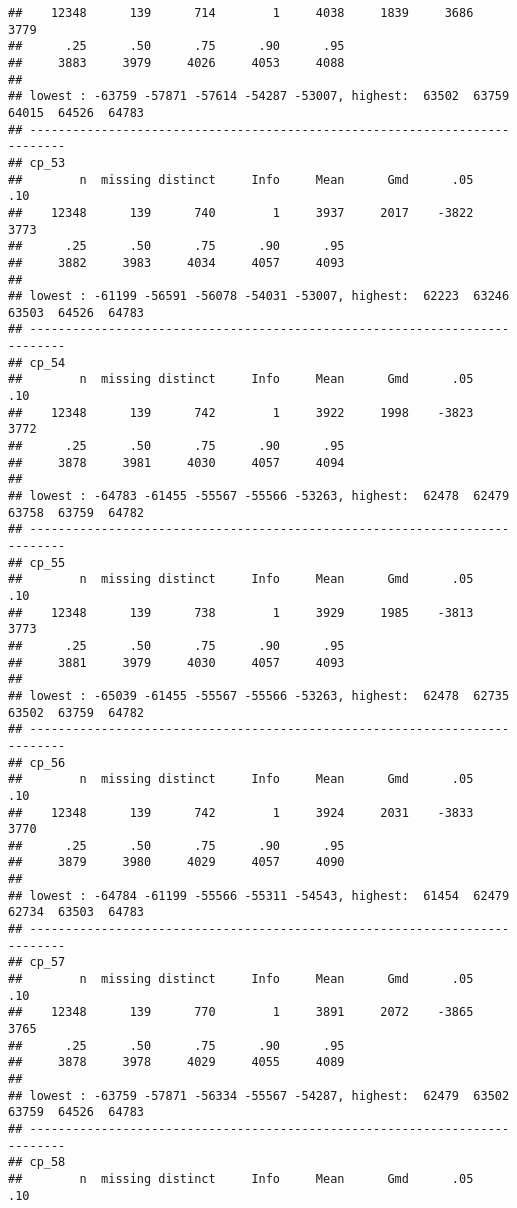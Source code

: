 \documentclass[]{article}
\begin{document}
\begin{verbatim}
##    12348      139      714        1     4038     1839     3686     3779 
##      .25      .50      .75      .90      .95 
##     3883     3979     4026     4053     4088 
## 
## lowest : -63759 -57871 -57614 -54287 -53007, highest:  63502  63759  64015  64526  64783
## ---------------------------------------------------------------------------
## cp_53 
##        n  missing distinct     Info     Mean      Gmd      .05      .10 
##    12348      139      740        1     3937     2017    -3822     3773 
##      .25      .50      .75      .90      .95 
##     3882     3983     4034     4057     4093 
## 
## lowest : -61199 -56591 -56078 -54031 -53007, highest:  62223  63246  63503  64526  64783
## ---------------------------------------------------------------------------
## cp_54 
##        n  missing distinct     Info     Mean      Gmd      .05      .10 
##    12348      139      742        1     3922     1998    -3823     3772 
##      .25      .50      .75      .90      .95 
##     3878     3981     4030     4057     4094 
## 
## lowest : -64783 -61455 -55567 -55566 -53263, highest:  62478  62479  63758  63759  64782
## ---------------------------------------------------------------------------
## cp_55 
##        n  missing distinct     Info     Mean      Gmd      .05      .10 
##    12348      139      738        1     3929     1985    -3813     3773 
##      .25      .50      .75      .90      .95 
##     3881     3979     4030     4057     4093 
## 
## lowest : -65039 -61455 -55567 -55566 -53263, highest:  62478  62735  63502  63759  64782
## ---------------------------------------------------------------------------
## cp_56 
##        n  missing distinct     Info     Mean      Gmd      .05      .10 
##    12348      139      742        1     3924     2031    -3833     3770 
##      .25      .50      .75      .90      .95 
##     3879     3980     4029     4057     4090 
## 
## lowest : -64784 -61199 -55566 -55311 -54543, highest:  61454  62479  62734  63503  64783
## ---------------------------------------------------------------------------
## cp_57 
##        n  missing distinct     Info     Mean      Gmd      .05      .10 
##    12348      139      770        1     3891     2072    -3865     3765 
##      .25      .50      .75      .90      .95 
##     3878     3978     4029     4055     4089 
## 
## lowest : -63759 -57871 -56334 -55567 -54287, highest:  62479  63502  63759  64526  64783
## ---------------------------------------------------------------------------
## cp_58 
##        n  missing distinct     Info     Mean      Gmd      .05      .10 

\end{verbatim}
\end{document}
